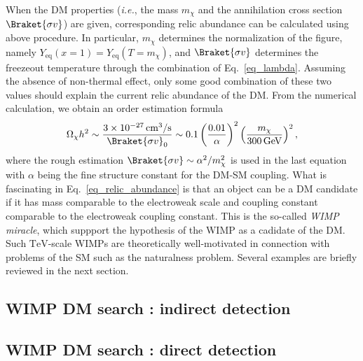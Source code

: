 \documentclass[12pt,twoside,book]{article}
\begin{document}
When the DM properties (\textit{i.e.}, the mass $m_\chi$ and the
annihilation cross section $\Braket{\sigma v}$) are given,
corresponding relic abundance can be calculated using above procedure.
In particular, $m_\chi$ determines the normalization of the figure,
namely $Y_{\mathrm{eq}} (x=1) = Y_{\mathrm{eq}} (T=m_\chi)$, and
$\Braket{\sigma v}$ determines the freezeout temperature through the
combination of Eq.~\eqref{eq_lambda}.  Assuming the absence of
non-thermal effect, only some good combination of these two values
should explain the current relic abundance of the DM.  From the
numerical calculation, we obtain an order estimation formula
\begin{align}
 \Omega_\chi h^2 \sim \frac{3 \times 10^{-27}\,\mathrm{cm^3}/\mathrm{s}}
 {\Braket{\sigma v}_0} \sim
 0.1 \left( \frac{0.01}{\alpha} \right)^2
 \left( \frac{m_\chi}{300\,\mathrm{GeV}} \right)^2,\label{eq_relic_abundance}
\end{align}
where the rough estimation $\Braket{\sigma v} \sim \alpha^2/m_\chi^2$
is used in the last equation with $\alpha$ being the fine structure
constant for the DM-SM coupling.  What is fascinating in
Eq.~\eqref{eq_relic_abundance} is that an object can be a DM candidate
if it has mass comparable to the electroweak scale and coupling
constant comparable to the electroweak coupling constant.  This is the
so-called \textit{WIMP miracle}, which suppport the hypothesis of the
WIMP as a cadidate of the DM.  Such $\mathrm{TeV}$-scale WIMPs are
theoretically well-motivated in connection with problems of the SM
such as the naturalness problem.  Several examples are briefly
reviewed in the next section.

\subsection{WIMP DM search : indirect detection}



\subsection{WIMP DM search : direct detection}


\end{document}
